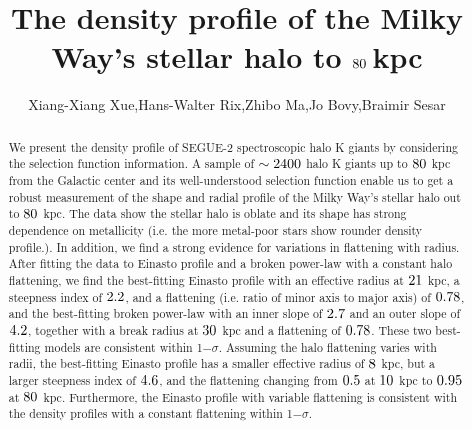 \documentclass[12pt,preprint]{aastex}
\begin{document}
\title{The density profile of the Milky Way's stellar halo to $\rm 80~$kpc}

\author{Xiang-Xiang Xue,Hans-Walter Rix,Zhibo Ma,Jo Bovy,Braimir Sesar}



\begin{abstract}
We present the density profile of SEGUE-2 spectroscopic halo K giants by considering the selection function information. A sample of $\rm \sim2400$ halo K giants up to $\rm 80~$kpc from the Galactic center and its well-understood selection function enable us to get a robust measurement of the shape and radial profile of the Milky Way's stellar halo out to $\rm 80~$kpc. The data show the stellar halo is oblate and its shape has strong dependence on metallicity (i.e. the more metal-poor stars show rounder density profile.). In addition, we find a strong evidence for variations in flattening with radius. After fitting the data to Einasto profile and a broken power-law with a constant halo flattening, we find the best-fitting Einasto profile with an effective radius at $\rm 21~$kpc, a steepness index of $\rm 2.2$, and a flattening (i.e. ratio of minor axis to major axis) of $\rm 0.78$, and the best-fitting broken power-law with an inner slope of $\rm 2.7$ and an outer slope of $\rm 4.2$, together with a break radius at $\rm 30~$kpc and a flattening of $\rm 0.78$. These two best-fitting models are consistent within 1$-\sigma$. Assuming the halo flattening varies with radii, the best-fitting Einasto profile has a smaller effective radius of $\rm 8~$kpc, but a larger steepness index of $\rm 4.6$, and the flattening changing from $\rm 0.5$ at $\rm 10~$kpc to $\rm 0.95$ at $\rm 80~$kpc. Furthermore, the Einasto profile with variable flattening is consistent with the density profiles with a constant flattening within 1$-\sigma$.          
\end{abstract}

\end{document}
